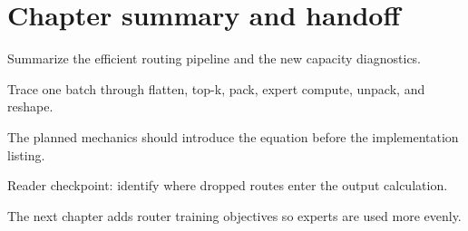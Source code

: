 \section{Chapter summary and handoff}
\label{sec:ch06-chapter-summary-and-handoff}

Summarize the efficient routing pipeline and the new capacity diagnostics.



Trace one batch through flatten, top-k, pack, expert compute, unpack, and reshape.



The planned mechanics should introduce the equation before the implementation listing.





\begin{checkpointbox}
Reader checkpoint: identify where dropped routes enter the output calculation.
\end{checkpointbox}

The next chapter adds router training objectives so experts are used more evenly.
